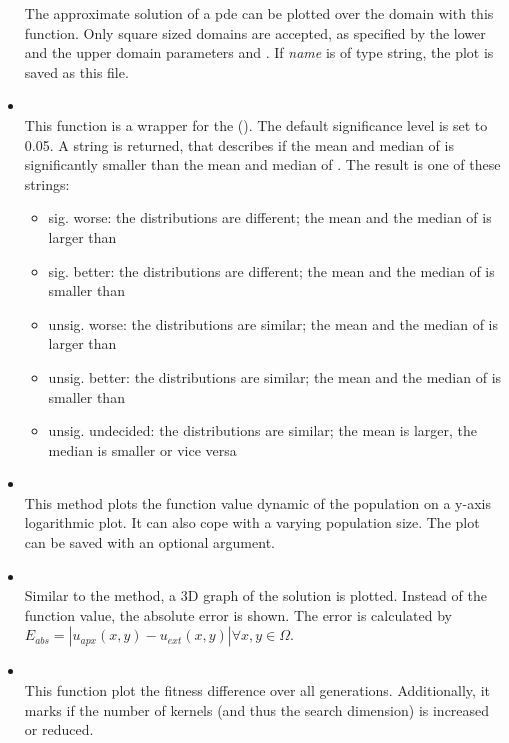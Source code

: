 \documentclass[.\jobname.tex]{subfiles}
\begin{document}
\begin{itemize}
	The approximate solution of a \gls{pde} can be plotted over the domain with this function. Only square sized domains are accepted, as specified by the lower and the upper domain parameters  and . If \textit{name} is of type string, the plot is saved as this file.
	\item 
	 \\
	This function is a wrapper for the  (\cite{scipy_scipystatswilcoxon_2020}). The default significance level is set to 0.05. A string is returned, that describes if the mean and median of  is significantly smaller than the mean and median of . The result is one of these strings: 
	\begin{itemize}
		\item sig. worse: the distributions are different; the mean and the median of  is larger than 
		\item sig. better: the distributions are different; the mean and the median of  is smaller than 
		\item unsig. worse: the distributions are similar; the mean and the median of  is larger than  
		\item unsig. better: the distributions are similar; the mean and the median of  is smaller than 
		\item unsig. undecided: the distributions are similar; the mean is larger, the median is smaller or vice versa
	\end{itemize} 
	\item {} \\
	This method plots the function value dynamic of the population on a y-axis logarithmic plot. It can also cope with a varying population size. The plot can be saved with an optional argument. 
	\item {} \\
	Similar to the 	 method, a 3D graph of the solution is plotted. Instead of the function value, the absolute error is shown. The error is calculated by $E_{abs}  = \left| u_{apx}(x,y) - u_{ext}(x,y) \right| \forall x,y \in \Omega$. 
	\item {} \\
	This function plot the fitness difference over all generations. Additionally, it marks if the number of kernels (and thus the search dimension) is increased or reduced. 
\end{itemize}
\end{document}
